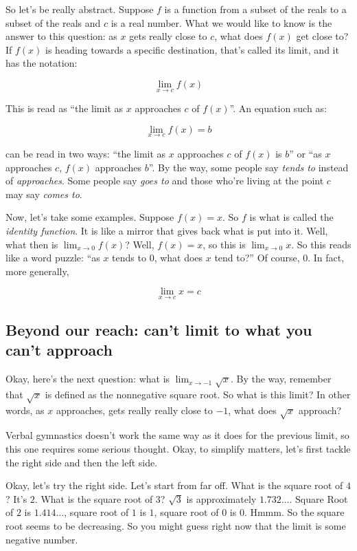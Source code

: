 \documentclass[10pt]{amsart}
\begin{document}
So let's be really abstract. Suppose $f$ is a function from a subset
of the reals to a subset of the reals and $c$ is a real number. What
we would like to know is the answer to this question: as $x$ gets
really close to $c$, what does $f(x)$ get close to? If $f(x)$ is
heading towards a specific destination, that's called its limit, and
it has the notation:

$$\lim_{x \to c} f(x)$$

This is read as ``the limit as $x$ approaches $c$ of $f(x)$''. An
equation such as:

\begin{equation*}
  \lim_{x \to c} f(x) = b
\end{equation*}

can be read in two ways: ``the limit as $x$ approaches $c$ of $f(x)$
is $b$'' or ``as $x$ approaches $c$, $f(x)$ approaches $b$''. By the
way, some people say {\em tends to} instead of {\em approaches}. Some
people say {\em goes to} and those who're living at the point $c$ may
say {\em comes to}.

Now, let's take some examples. Suppose $f(x) = x$. So $f$ is what is
called the {\em identity function}. It is like a mirror that gives
back what is put into it. Well, what then is $\lim_{x \to 0} f(x)$?
Well, $f(x) = x$, so this is $\lim_{x \to 0} x$. So this reads like a
word puzzle: ``as $x$ tends to $0$, what does $x$ tend to?'' Of
course, $0$. In fact, more generally,

\begin{equation*}
  \lim_{x \to c} x = c
\end{equation*}

\subsection{Beyond our reach: can't limit to what you can't approach}

Okay, here's the next question: what is $\lim_{x \to -1} \sqrt{x}$. By
the way, remember that $\sqrt{x}$ is defined as the nonnegative
square root. So what is this limit? In other words, as $x$ approaches,
gets really really close to $-1$, what does $\sqrt{x}$ approach?

Verbal gymnastics doesn't work the same way as it does for the
previous limit, so this one requires some serious thought. Okay, to
simplify matters, let's first tackle the right side and then the left
side.

Okay, let's try the right side. Let's start from far off. What is the
square root of $4$? It's $2$. What is the square root of $3$? $\sqrt{3}$
is approximately $1.732 \dots$. Square Root of $2$ is $1.414 \dots$,
square root of $1$ is $1$, square root of $0$ is $0$. Hmmm. So the
square root seems to be decreasing. So you might guess right now that
the limit is some negative number.
\end{document}
